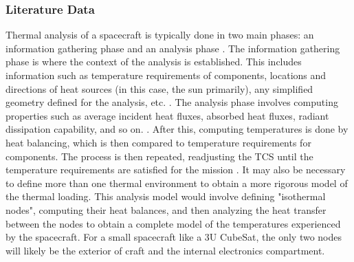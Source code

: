 \subsubsection{Literature Data}
Thermal analysis of a spacecraft is typically done in two main phases: an information gathering phase and an analysis phase \cite{SMAD}. The information gathering phase is where the context of the analysis is established. This includes information such as temperature requirements of components, locations and directions of heat sources (in this case, the sun primarily), any simplified geometry defined for the analysis, etc. \cite{SMAD}. The analysis phase involves computing properties such as average incident heat fluxes, absorbed heat fluxes, radiant dissipation capability, and so on. \cite{SMAD}. After this, computing temperatures is done by heat balancing, which is then compared to temperature requirements for components. The process is then repeated, readjusting the TCS until the temperature requirements are satisfied for the mission \cite{SMAD}. It may also be necessary to define more than one thermal environment to obtain a more rigorous model of the thermal loading. This analysis model would involve defining "isothermal nodes", computing their heat balances, and then analyzing the heat transfer between the nodes to obtain a complete model of the temperatures experienced by the spacecraft. For a small spacecraft like a 3U CubeSat, the only two nodes will likely be the exterior of craft and the internal electronics compartment.
